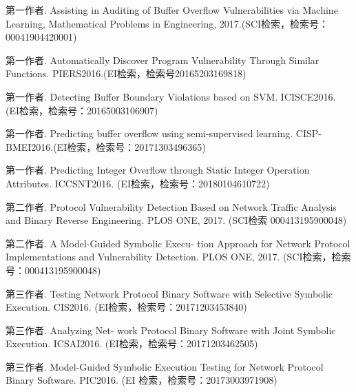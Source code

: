 \begin{resume}
  
  \begin{enumerate}[{[}1{]}]
    \item 第一作者. Assisting in Auditing of Buffer Overflow Vulnerabilities via Machine Learning, Mathematical Problems in Engineering, 2017.(SCI检索，检索号：00041904420001)
    
    \item 第一作者. Automatically Discover Program Vulnerability Through Similar Functions. PIERS2016.(EI检索，检索号20165203169818)
    
    \item 第一作者. Detecting Buffer Boundary Violations based on SVM. ICISCE2016. (EI检索，检索号：20165003106907)
    
    \item 第一作者. Predicting buffer overflow using semi-supervised learning. CISP-BMEI2016.(EI检索，检索号：20171303496365)
    
    \item 第一作者. Predicting Integer Overflow through Static Integer Operation Attributes. ICCSNT2016. (EI检索，检索号：20180104610722)
    
    \item 第二作者. Protocol Vulnerability Detection Based on Network Traffic Analysis and Binary Reverse Engineering. PLOS ONE, 2017. (SCI检索 000413195900048)
      
    \item 第二作者. A Model-Guided Symbolic Execu-
    tion Approach for Network Protocol Implementations and Vulnerability Detection.
    PLOS ONE, 2017. (SCI检索，检索号：000413195900048)
    
    \item 第三作者. Testing Network
    Protocol Binary Software with Selective Symbolic Execution. CIS2016. (EI检索，检索号：20171203453840)
    
    \item 第三作者. Analyzing Net-
    work Protocol Binary Software with Joint Symbolic Execution. ICSAI2016. (EI检索，检索号：20171203462505)
    
    \item 第三作者. Model-Guided
    Symbolic Execution Testing for Network Protocol Binary Software. PIC2016. (EI
    检索，检索号：20173003971908)
    

\end{enumerate}
\end{resume}
